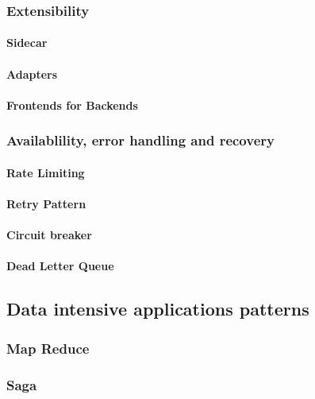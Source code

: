 \documentclass[a4paper, 11pt]{book}
\begin{document}
    \subsubsection{Extensibility}

    \paragraph{Sidecar}

    \paragraph{Adapters}

    \paragraph{Frontends for Backends}

    \subsubsection{Availablility, error handling and recovery}

    \paragraph{Rate Limiting}

    \paragraph{Retry Pattern}

    \paragraph{Circuit breaker}

    \paragraph{Dead Letter Queue}

    \subsection{Data intensive applications patterns}
    \subsubsection{Map Reduce}
    \subsubsection{Saga}
\end{document}
